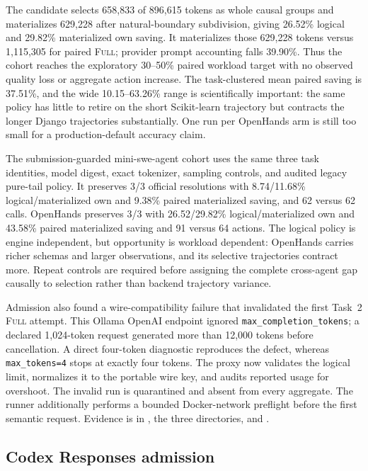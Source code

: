 \documentclass[11pt]{article}
\begin{document}
The candidate selects 658,833 of 896,615 tokens as whole causal groups and
materializes 629,228 after natural-boundary subdivision, giving 26.52\%
logical and 29.82\% materialized own saving.  It materializes those 629,228
tokens versus 1,115,305 for paired \textsc{Full}; provider prompt accounting
falls 39.90\%.  Thus the cohort reaches the exploratory 30--50\% paired
workload target with no observed quality loss or aggregate action increase.
The task-clustered mean paired saving is 37.51\%, and the wide
10.15--63.26\% range is scientifically important: the same policy has little
to retire on the short Scikit-learn trajectory but contracts the longer
Django trajectories substantially.  One run per OpenHands arm is still too
small for a production-default accuracy claim.

The submission-guarded mini-swe-agent cohort uses the same three task
identities, model digest, exact tokenizer, sampling controls, and audited
legacy pure-tail policy.  It preserves 3/3 official resolutions with
8.74/11.68\% logical/materialized own and 9.38\% paired materialized saving,
and 62 versus 62 calls.  OpenHands preserves 3/3 with 26.52/29.82\%
logical/materialized own and 43.58\% paired materialized saving and 91 versus
64 actions.  The logical policy is
engine independent, but opportunity is workload dependent: OpenHands carries
richer schemas and larger observations, and its selective trajectories
contract more.  Repeat controls are required before assigning the complete
cross-agent gap causally to selection rather than backend trajectory variance.

Admission also found a wire-compatibility failure that invalidated the first
Task~2 \textsc{Full} attempt.  This Ollama OpenAI endpoint ignored
\texttt{max\_completion\_tokens}; a declared 1,024-token request generated
more than 12,000 tokens before cancellation.  A direct four-token diagnostic
reproduces the defect, whereas \texttt{max\_tokens=4} stops at exactly four
tokens.  The proxy now validates the logical limit, normalizes it to the
portable wire key, and audits reported usage for overshoot.  The invalid run
is quarantined and absent from every aggregate.  The runner additionally
performs a bounded Docker-network preflight before the first semantic request.
Evidence is in
,
the three  directories, and
.

\subsection{Codex Responses admission}
\end{document}
